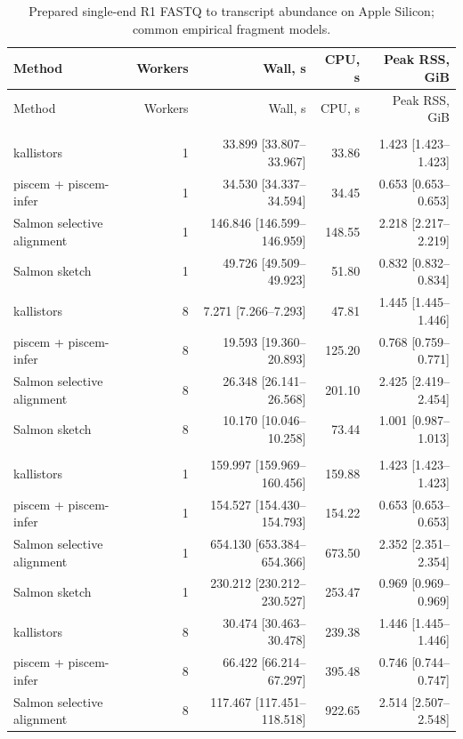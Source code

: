 \begingroup
\small
\setlength{\tabcolsep}{4pt}
\begin{longtable}{@{}lrrrr@{}}
\caption{Prepared single-end R1 FASTQ to transcript abundance on Apple Silicon; common empirical fragment models.}\label{tab:paper-bulk-single}\\
\toprule
Method & Workers & Wall, s & CPU, s & Peak RSS, GiB \\
\midrule
\endfirsthead
\toprule
Method & Workers & Wall, s & CPU, s & Peak RSS, GiB \\
\midrule
\endhead
\bottomrule
\endfoot
\addlinespace
\multicolumn{5}{@{}l}{\textit{SRR13638690-se}} \\
kallistors & 1 & 33.899 [33.807--33.967] & 33.86 & 1.423 [1.423--1.423] \\
piscem + piscem-infer & 1 & 34.530 [34.337--34.594] & 34.45 & 0.653 [0.653--0.653] \\
Salmon selective alignment & 1 & 146.846 [146.599--146.959] & 148.55 & 2.218 [2.217--2.219] \\
Salmon sketch & 1 & 49.726 [49.509--49.923] & 51.80 & 0.832 [0.832--0.834] \\
kallistors & 8 & 7.271 [7.266--7.293] & 47.81 & 1.445 [1.445--1.446] \\
piscem + piscem-infer & 8 & 19.593 [19.360--20.893] & 125.20 & 0.768 [0.759--0.771] \\
Salmon selective alignment & 8 & 26.348 [26.141--26.568] & 201.10 & 2.425 [2.419--2.454] \\
Salmon sketch & 8 & 10.170 [10.046--10.258] & 73.44 & 1.001 [0.987--1.013] \\
\addlinespace
\multicolumn{5}{@{}l}{\textit{SRR307903-se}} \\
kallistors & 1 & 159.997 [159.969--160.456] & 159.88 & 1.423 [1.423--1.423] \\
piscem + piscem-infer & 1 & 154.527 [154.430--154.793] & 154.22 & 0.653 [0.653--0.653] \\
Salmon selective alignment & 1 & 654.130 [653.384--654.366] & 673.50 & 2.352 [2.351--2.354] \\
Salmon sketch & 1 & 230.212 [230.212--230.527] & 253.47 & 0.969 [0.969--0.969] \\
kallistors & 8 & 30.474 [30.463--30.478] & 239.38 & 1.446 [1.445--1.446] \\
piscem + piscem-infer & 8 & 66.422 [66.214--67.297] & 395.48 & 0.746 [0.744--0.747] \\
Salmon selective alignment & 8 & 117.467 [117.451--118.518] & 922.65 & 2.514 [2.507--2.548] \\

\end{longtable}
